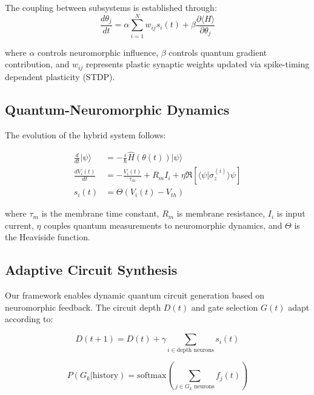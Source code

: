 \documentclass[arxiv,final,oneside,onecolumn]{arxiv-preprint-simple}
\newcommand{\qstate}[1]{|#1\rangle}
\newcommand{\qbraket}[2]{\langle#1|#2\rangle}
\newcommand{\qexpect}[1]{\langle#1\rangle}
\newcommand{\qgate}[1]{\hat{#1}}
\newcommand{\spike}[1]{s_{#1}(t)}
\newcommand{\membrane}[1]{V_{#1}(t)}
\newcommand{\weight}[2]{w_{#1#2}}
\newcommand{\firing}[1]{f_{#1}(t)}
\begin{document}
The coupling between subsystems is established through:
\begin{equation}
\frac{d\theta_j}{dt} = \alpha \sum_{i=1}^{N} \weight{i}{j} \spike{i} + \beta \frac{\partial \qexpect{H}}{\partial \theta_j}
\label{eq:coupling}
\end{equation}

where $\alpha$ controls neuromorphic influence, $\beta$ controls quantum gradient contribution, and $\weight{i}{j}$ represents plastic synaptic weights updated via spike-timing dependent plasticity (STDP).

\subsection{Quantum-Neuromorphic Dynamics}

The evolution of the hybrid system follows:

\begin{align}
\frac{d}{dt}\qstate{\psi} &= -\frac{i}{\hbar}\qgate{H}(\theta(t))\qstate{\psi} \label{eq:schrodinger}\\
\frac{d\membrane{i}}{dt} &= -\frac{\membrane{i}}{\tau_m} + R_m I_i + \eta \Re[\qbraket{\psi}{\sigma_z^{(i)}}{\psi}] \label{eq:membrane}\\
\spike{i} &= \Theta(\membrane{i} - V_{th}) \label{eq:spike}
\end{align}

where $\tau_m$ is the membrane time constant, $R_m$ is membrane resistance, $I_i$ is input current, $\eta$ couples quantum measurements to neuromorphic dynamics, and $\Theta$ is the Heaviside function.

\subsection{Adaptive Circuit Synthesis}

Our framework enables dynamic quantum circuit generation based on neuromorphic feedback. The circuit depth $D(t)$ and gate selection $G(t)$ adapt according to:

\begin{equation}
D(t+1) = D(t) + \gamma \sum_{i \in \text{depth neurons}} \spike{i}
\label{eq:depth_adaptation}
\end{equation}

\begin{equation}
P(G_k | \text{history}) = \text{softmax}\left(\sum_{j \in G_k \text{ neurons}} \firing{j}\right)
\label{eq:gate_selection}
\end{equation}
\end{document}
